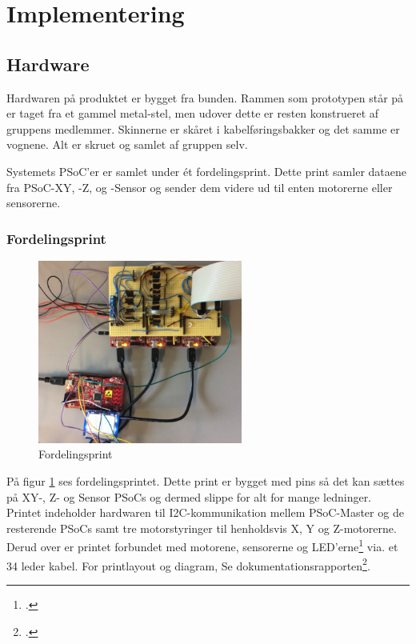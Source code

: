\section{Implementering}

\subsection{Hardware}

Hardwaren på produktet er bygget fra bunden. Rammen som prototypen står på er taget fra et gammel metal-stel, men udover dette er resten konstrueret af gruppens medlemmer. Skinnerne er skåret i kabelføringsbakker og det samme er vognene. Alt er skruet og samlet af gruppen selv. 

Systemets PSoC'er er samlet under ét fordelingsprint. Dette print samler dataene fra PSoC-XY, -Z, og -Sensor og sender dem videre ud til enten motorerne eller sensorerne. 

\subsubsection{Fordelingsprint}
\begin{figure}[H] \centering
    \includegraphics[width=0.6\textwidth]{Filer/FordelingsPrint.PNG}
    \caption{Fordelingsprint}
    \label{fig:Fordelingsprint}
\end{figure}

På figur \ref{fig:Fordelingsprint} ses fordelingsprintet. Dette print er bygget med pins så det kan sættes på XY-, Z- og Sensor PSoCs og dermed slippe for alt for mange ledninger. Printet indeholder hardwaren til I2C-kommunikation mellem PSoC-Master og de resterende PSoCs samt tre motorstyringer til henholdsvis X, Y og Z-motorerne. Derud over er printet forbundet med motorene, sensorerne og LED'erne\footcite{L-154A4} via. et 34 leder kabel.
For printlayout og diagram, Se dokumentationsrapporten\footcite{documentation}.

